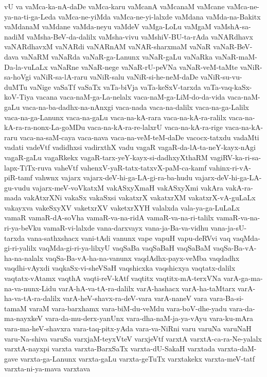 {vU
va
vaMca-ka-nA-daDe
vaMca-karu
vaMcanA
vaMcanaM
vaMcane
vaMca-ne-ya-na-ti-ga-Leda
vaMca-ne-yiMda
vaMca-ne-yi-lalxde
vaMdana
vaMda-na-Bakitx
vaMdanaM
vaMdane
vaMda-neyu
vaMdeV
vaMga-LoLu
vaMgaM
vaMshA-sa-nadiM
vaMsha-BeV-da-dalilx
vaMsha-vivu
vaMshiV-BU-ta-rAda
vaNARdhavx
vaNARdhavxM
vaNARdi
vaNARnAM
vaNAR-sharxmaM
vaNaR
vaNaR-BeV-dava
vaNaRM
vaNaRda
vaNaR-ga-Lanunx
vaNaR-gaLu
vaNaRka
vaNaR-maM-Da-la-vuLaLx
vaNaRne
vaNaR-nege
vaNaR-rU-peVNa
vaNaR-veM-taMte
vaNiR-sa-hoVgi
vaNiR-sa-lA-raru
vaNiR-salu
vaNiR-si-he-neM-daDe
vaNiR-su-vu-duMTu
vaNige
vaSaTf
vaSaTx
vaTa-biVja
vaTa-keSxV-tarxda
vaTa-vaq-kaSx-koV-Tiya
vacana
vaca-naM-ga-La-nelalx
vaca-naM-ga-LiM-do-da-vida
vaca-naM-gaLu
vaca-na-ba-dadhx-na-nAnxgi
vaca-nada
vaca-na-dalilx
vaca-na-ga-Lalilx
vaca-na-ga-Lanunx
vaca-na-gaLu
vaca-na-kA-rara
vaca-na-kA-ra-ralilx
vaca-na-kA-ra-ra-nonx-La-goMDu
vaca-na-kA-ra-re-lalxrU
vaca-na-kA-ra-rige
vaca-na-kA-raru
vaca-na-saM-caya
vaca-nava
vaca-na-veM-teM-daDe
vacocx-tatxdu
vadaMti
vadati
vadeVtf
vadidhxsi
vadirxthX
vadu
vagaR
vagaR-da-lA-ta-neY-kayx-nAgi
vagaR-gaLu
vagaRkekx
vagaR-tarx-yeY-kayx-si-dadhxyXthaRM
vagiRV-ka-ri-sa-lapx-TiTx-ruva
vaheVtf
vahenxV-yaR-tatx-tatxvX-paM-ca-kamf
vahinx-ri-vA-piR-tamf
vahwnx
vajarx
vajarx-deV-hi-ga-LA-gi-ra-ba-hudu
vajarx-deV-hi-ga-LA-gu-vudu
vajarx-meV-voVkatxM
vakASxyXmaH
vakASxyXmi
vakAra
vakA-ra-mada
vakAtxrXNi
vakaSx
vakaSxsi
vakatxrX
vakatxrXM
vakatxrX-vA-guLaLx
vakayxva
vakeSxyXV
vaketxrXV
vaketxrXYH
valalxda
vala-ya-ga-LuLaLx
vamaR
vamaR-dA-soVha
vamaR-va-na-ridA
vamaR-va-na-ri-talilx
vamaR-va-na-ri-ya-beVku
vamaR-vi-lalxde
vana-darxvayx
vana-ja-Ba-va-vidhu
vana-ja-sU-tarxda
vana-sathxshacx
vani-tAdi
vanunx
vape
vapuH
vapu-deRVvi
vaq
vaqMda-gi-ri-yalilx
vaqMda-gi-ri-ya-lilxyU
vaqSaBa
vaqSaBaH
vaqSaBaM
vaqSa-Ba-vA-ha-na-nalalx
vaqSa-Ba-vA-ha-na-vanunx
vaqdAdhx-payx-veMba
vaqdadhx
vaqdhi-vAyxdi
vaqkaSx-vi-sheVSaH
vaqshicxka
vaqshicxya
vaqtatx-dalilx
vaqtatx-vAtamx
vaqthA
vaqti-reV-kAtf
vaqtitx
vaqtitx-mA-terxVNa
varA-ga-ma-na-va-nunx-Lidu
varA-hA-va-tA-ra-dalilx
varA-hashacx
varA-ha-taMtarx
varA-ha-va-tA-ra-dalilx
varA-heV-shavx-ra-deV-vara
varA-naneV
vara
vara-Ba-si-tamaM
varaM
vara-barxhamx
vara-biM-du-veMdu
vara-boV-dhe-yadu
vara-da-ma-nayxkeV
vara-da-mu-derx-yanUnx
vara-dha-naM-ja-ya-vAyu
vara-ku-mAra
vara-ma-heV-shavxra
vara-taq-pitx-yAda
vara-va-NiRni
varu
varuNa
varuNaH
varu-Na-shiva
varuSa
varxjaM-teyxVteV
varxjeVtf
varxtA
varxtA-ca-ra-Ne-yalalx
varxtA-nayxpi
varxta
varxta-BarxSaTx
varxta-dU-SakaH
varxtada
varxta-daM-gave
varxta-ga-Lanunx
varxta-gaLu
varxta-geTuTx
varxtakekx
varxta-meV-tatf
varxta-ni-ya-mava
varxtava
}
